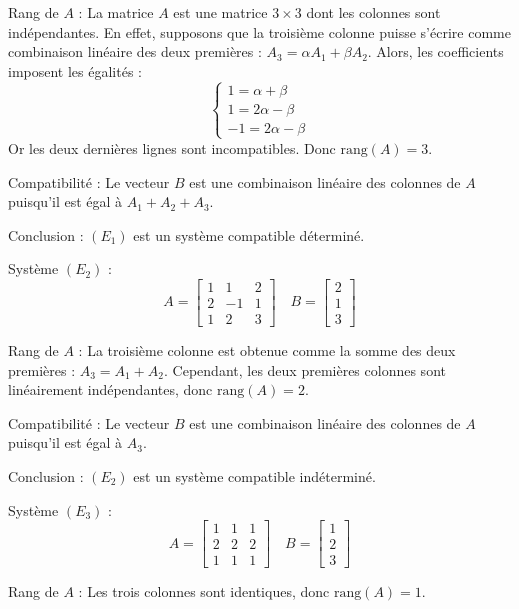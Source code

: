 \documentclass[10pt,a4paper]{article}
\begin{document}
Rang de \( A \) :  La matrice \( A \) est une matrice \( 3 \times 3 \) dont les colonnes sont
indépendantes. En effet, supposons que la troisième colonne puisse s'écrire comme combinaison
linéaire des deux premières : \( A_3 = \alpha A_1 + \beta A_2 \). Alors, les coefficients imposent
les égalités :
\[
\begin{cases}
1 = \alpha + \beta \\
1 = 2\alpha - \beta \\
-1 = 2\alpha - \beta
\end{cases}
\]
Or les deux dernières lignes sont incompatibles.
Donc \(\text{rang}(A) = 3\).

Compatibilité : Le vecteur \( B \) est une combinaison linéaire des colonnes de \( A \)
puisqu'il est égal à \( A_1 + A_2 + A_3 \).

Conclusion : \( (E_1) \) est un système compatible déterminé.

Système \((E_2)\) :
\[
A =
\begin{bmatrix}
1 & 1 & 2 \\
2 & -1 & 1 \\
1 & 2 & 3
\end{bmatrix}
\quad
B = \begin{bmatrix} 2 \\ 1 \\ 3 \end{bmatrix}
\]

Rang de \( A \) : La troisième colonne est obtenue comme la somme des deux premières : \( A_3 = A_1
+ A_2 \). Cependant, les deux premières colonnes sont linéairement indépendantes, donc \(
\text{rang}(A) = 2 \).

Compatibilité : Le vecteur \( B \) est une combinaison linéaire des colonnes de \( A \) puisqu'il
est égal à \( A_3 \).

Conclusion : \( (E_2) \) est un système compatible indéterminé.

Système \((E_3)\) :
\[
A =
\begin{bmatrix}
1 & 1 & 1 \\
2 & 2 & 2 \\
1 & 1 & 1
\end{bmatrix}
\quad
B = \begin{bmatrix} 1 \\ 2 \\  3 \end{bmatrix}
\]

Rang de \( A \) : Les trois colonnes sont identiques, donc \(\text{rang}(A) = 1\).
\end{document}
